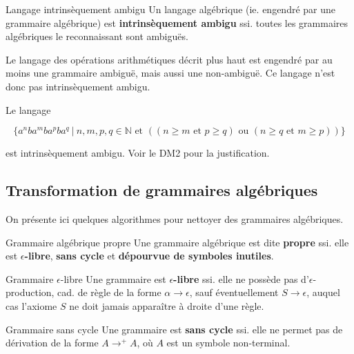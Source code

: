 \begin{definition}{Langage intrinsèquement ambigu}{}
Un langage algébrique (ie. engendré par une grammaire algébrique) est \textbf{intrinsèquement ambigu} ssi. toutes les grammaires algébriques le reconnaissant sont ambiguës.
\end{definition}

\begin{example}
Le langage des opérations arithmétiques décrit plus haut est engendré par au moins une grammaire ambiguë, mais aussi une non-ambiguë. Ce langage n'est donc pas intrinsèquement ambigu. 
\end{example}

\begin{example}
Le langage 

\[
\{a^nba^mba^pba^q ~|~ n,m,p,q \in \mathbb{N} \text{ et } ((n \geq m \text{ et } p \geq q) \text{ ou } (n \geq q \text{ et } m \geq p))\}
\]

est intrinsèquement ambigu. Voir le DM2 pour la justification.
\end{example}

\subsection{Transformation de grammaires algébriques}

On présente ici quelques algorithmes pour nettoyer des grammaires algébriques.

\begin{definition}{Grammaire algébrique propre}{}
Une grammaire algébrique est dite \textbf{propre} ssi. elle est \textbf{$\epsilon$-libre}, \textbf{sans cycle} et \textbf{dépourvue de symboles inutiles}.
\end{definition}

\begin{definition}{Grammaire $\epsilon$-libre}{}
Une grammaire est \textbf{$\epsilon$-libre} ssi. elle ne possède pas d'$\epsilon$-production, cad. de règle de la forme $\alpha \rightarrow \epsilon$, sauf éventuellement $S \rightarrow \epsilon$, auquel cas l'axiome $S$ ne doit jamais apparaître à droite d'une règle.
\end{definition}

\begin{definition}{Grammaire sans cycle}{}
Une grammaire est \textbf{sans cycle} ssi. elle ne permet pas de dérivation de la forme $A \rightarrow^+ A$, où $A$ est un symbole non-terminal. 
\end{definition}

